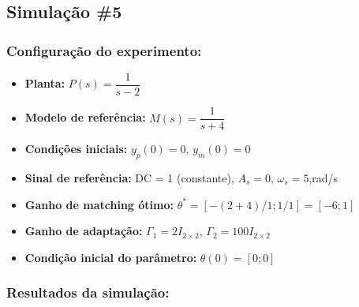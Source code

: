 \documentclass[10pt]{article}
\begin{document}
\newpage

\subsection{Simulação \#5}
\subsubsection{Configuração do experimento:}
\begin{itemize}
\item \textbf{Planta:} $P(s) = \dfrac{1}{s - 2}$
\item \textbf{Modelo de referência:} $M(s) = \dfrac{1}{s + 4}$
\item \textbf{Condições iniciais:} $y_p(0)=0$, $y_m(0)=0$
\item \textbf{Sinal de referência:} DC = 1 (constante), $A_s=0$, $\omega_s=5$,rad/s
\item \textbf{Ganho de matching ótimo:} $\theta^* = [-(2+4)/1;1/1] = [-6;1]$
\item \textbf{Ganho de adaptação:} $\Gamma_1 = 2I_{2\times2}$, $\Gamma_2 = 100 I_{2\times2}$
\item \textbf{Condição inicial do parâmetro:} $\theta(0) = [0;0]$
\end{itemize}

\subsubsection{Resultados da simulação:}
\end{document}
